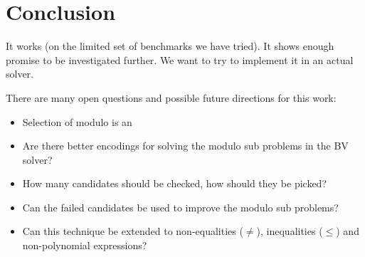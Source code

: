 \section{Conclusion}
\label{section:conclusion}

%
It works (on the limited set of benchmarks we have tried).
%
It shows enough promise to be investigated further.
We want to try to implement it in an actual solver.


There are many open questions and possible future directions for this work:

\begin{itemize}
\item{Selection of modulo is an }

\item{Are there better encodings for solving the modulo sub problems in the BV solver?}
\item{How many candidates should be checked, how should they be picked?}
\item{Can the failed candidates be used to improve the modulo sub problems?}
\item{Can this technique be extended to non-equalities ($\not=$), inequalities ($\leq$) and non-polynomial expressions?}
\end{itemize}
